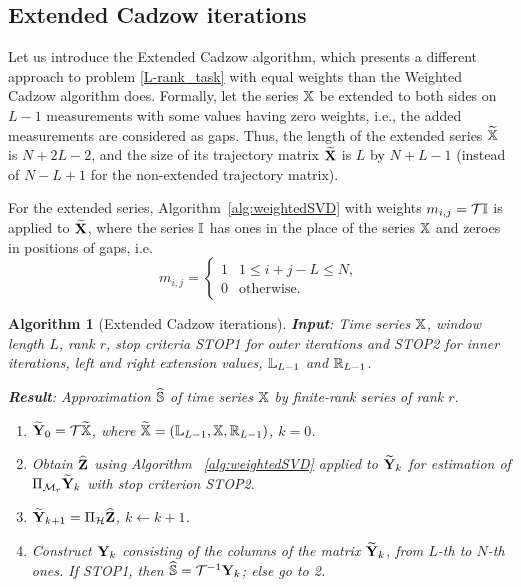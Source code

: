 \documentclass[sii]{ipart}
\newtheorem{algorithm}{Algorithm}
\begin{document}
\subsection{Extended Cadzow iterations}
Let us introduce the Extended Cadzow algorithm, which presents a different approach to problem \eqref{L-rank_task} with equal weights than the Weighted Cadzow algorithm does.
Formally, let the series $\mathbb{X}$ be extended to both sides on $L-1$ measurements with some values having zero weights, i.e., the added measurements are considered as gaps.
Thus, the length of the extended series $\widetilde{\mathbb{X}}$ is $N+2L-2$, and the size of its trajectory matrix $\widetilde{\mathbf{X}}$ is $L$ by $N+L-1$ (instead of $N-L+1$ for the non-extended trajectory matrix).

For the extended series, Algorithm~\ref{alg:weightedSVD} with weights $m_{i,j}=\mathcal{T} \mathbb{I}$ is applied to $\widetilde{\mathbf{X}}$, where the series $\mathbb{I}$ has ones in the place of the series $\mathbb{X}$ and zeroes in positions of gaps, i.e.
\begin{equation*}
m_{i,j} = \begin{cases}
1 & 1 \le i+j-L \le N, \\
0 & \text{otherwise.}
\end{cases}
\end{equation*}

\begin{algorithm}[Extended Cadzow iterations]\label{alg:ECIt}
	\textbf{Input}: Time series $\mathbb{X}$, window length $L$, rank $r$,
	stop criteria STOP1 for outer iterations and STOP2 for inner iterations,
	left and right extension values, $\mathbb{L}_{L-1}$ and $\mathbb{R}_{L-1}$.
	
	\textbf{Result}:
	Approximation $\widehat{\mathbb{S}}$ of time series $\mathbb{X}$ by finite-rank series of rank $r$.
	
	\begin{enumerate}
		\item
		$\widetilde{\mathbf{Y}}_0 = \mathcal{T} \widetilde{\mathbb{X}}$, where $\widetilde{\mathbb{X}}=(\mathbb{L}_{L-1}, \mathbb{X}, \mathbb{R}_{L-1})$, $k=0$.
		\item
		Obtain $\widehat{\mathbf{Z}}$ using Algorithm ~\ref{alg:weightedSVD} applied to $\widetilde{\mathbf{Y}}_k$ for estimation of $\Pi_{\mathcal{M}_r} \widetilde{\mathbf{Y}}_{k}$ with stop criterion STOP2.
		\item
		$\widetilde{\mathbf{Y}}_{k+1} = \Pi_{\mathcal{H}}  \widehat{\mathbf{Z}}$, $k\leftarrow k+1$.
		\item
		Construct $\mathbf{Y}_k$ consisting of the columns of the matrix $\widetilde{\mathbf{Y}}_{k}$, from $L$-th to $N$-th ones. If STOP1, then $\widehat{\mathbb{S}} = \mathcal{T}^{-1} \mathbf{Y}_k$; else go to 2.
	\end{enumerate}
\end{algorithm}
\end{document}
